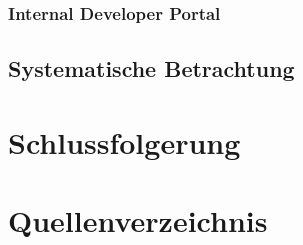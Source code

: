 \documentclass[a4paper,12pt]{article}
\begin{document}
    \subsubsection{Internal Developer Portal}

    \subsection{Systematische Betrachtung}


    \section{Schlussfolgerung}


    \section{Quellenverzeichnis}

    \printbibliography[heading=none]
\end{document}
